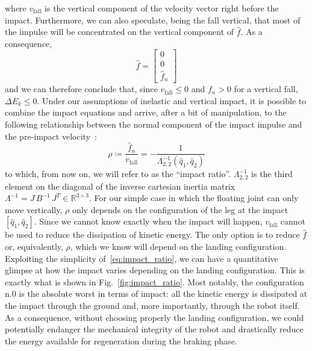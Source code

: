 where $v_{\mathrm{fall}}$ is the vertical component of the velocity vector right before the impact.
Furthermore, we can also speculate, being the fall vertical, that most of the impulse will be concentrated on the vertical component of $\hat{f}$. As a consequence, 
\begin{equation}\label{eq:f_hat_simpl}
    \hat{f} = \begin{bmatrix}
0\\
0\\
\hat{f}_{n}
\end{bmatrix}
\end{equation}
and we can therefore conclude that, since $v_{\mathrm{fall}} \leq 0$ and $f_n > 0$ for a vertical fall, $\Delta E_{k} \leq 0$. 
Under our assumptions of inelastic and vertical impact, it is possible to combine the impact equations and arrive, after a bit of manipulation, to the following relationship between the normal component of the impact impulse and the pre-impact velocity~\cite{impact_dyn::tassi2022impact}:
\begin{equation}\label{eq:impact_ratio}
    \rho \coloneqq \dfrac{\hat{f}_n}{v_{\mathrm{fall}}} = -\dfrac{1}{\Lambda^{-1}_{2,2}(\hat{q}_1, \hat{q}_2)}
\end{equation}
to which, from now on, we will refer to as the \enquote{impact ratio}. $\Lambda^{-1}_{2,2}$ is the third element on the diagonal of the inverse cartesian inertia matrix $\Lambda^{-1} = J\,B^{-1}\,J^{T}\in\mathbb{R}^{3\times3}$. For our simple case in which the floating joint can only move vertically, $\rho$ only depends on the configuration of the leg at the impact $\left[\hat{q}_1,\hat{q}_2 \right]$.
Since we cannot know exactly when the impact will happen, $v_{\mathrm{fall}}$ cannot be used to reduce the dissipation of kinetic energy. The only option is to reduce $\hat{f}$ or, equivalently, $\rho$, which we know will depend on the landing configuration. 
Exploiting the simplicity of~\eqref{eq:impact_ratio}, we can have a quantitative glimpse at how the impact varies depending on the landing configuration. This is exactly what is shown in Fig.~\ref{fig:impact_ratio}. Most notably, the configuration n.$0$ is the absolute worst in terms of impact: all the kinetic energy is dissipated at the impact through the ground and, more importantly, through the robot itself. As a consequence, without choosing properly the landing configuration, we could potentially endanger the mechanical integrity of the robot and drastically reduce the energy available for regeneration during the braking phase.

